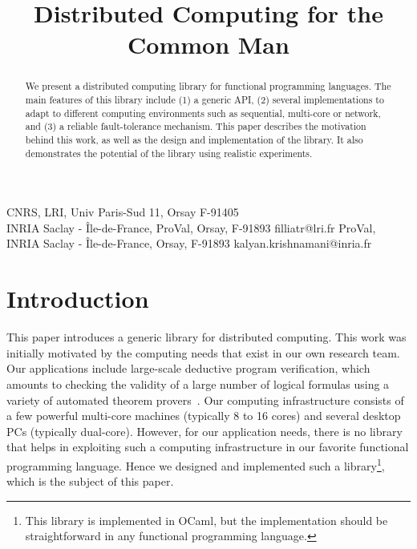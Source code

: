 \documentclass[preprint]{sigplanconf}
\newcommand{\Ocaml}{OCaml}
\begin{document}
\copyrightdata{[to be supplied]} 


\title{Distributed Computing for the Common Man}

           {CNRS, LRI, Univ Paris-Sud 11, Orsay F-91405\\
            INRIA Saclay - \^{I}le-de-France, ProVal, Orsay, F-91893}
           {filliatr@lri.fr}
           {ProVal, INRIA Saclay - \^{I}le-de-France, Orsay, F-91893}
           {kalyan.krishnamani@inria.fr}

\maketitle

\begin{abstract}
  We present a distributed computing library for
  functional programming languages. The main features of this library
  include (1) a generic API, (2) several implementations to
  adapt to different computing environments such as sequential,
  multi-core or network, and (3) a reliable fault-tolerance mechanism.
  This paper describes the motivation behind this work, as well as
  the design and implementation of the library. It also demonstrates
  the potential of the library using realistic experiments.
\end{abstract}




\section{Introduction}

This paper introduces a generic library for distributed computing. This
work was initially motivated by the computing needs that exist in our
own research team. Our applications include large-scale deductive
program verification, which amounts to checking the validity of a
large number of logical formulas using a variety of automated theorem
provers~\cite{filliatre07cav}. Our computing infrastructure consists
of a few powerful multi-core machines (typically 8 to 16 cores) and
several desktop PCs (typically dual-core). However, for our
application needs, there is no library that helps in exploiting such a
computing infrastructure in our favorite functional programming
language.  Hence we designed and implemented such a
library\footnote{This library is implemented in \Ocaml, but the
  implementation should be straightforward in any functional
  programming language.}, which is the subject of this paper.
\end{document}
